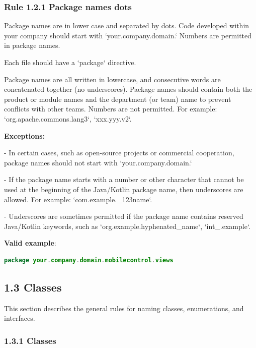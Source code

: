 \subsubsection*{\textbf{Rule 1.2.1 Package names dots}}
\leavevmode\newline

Package names are in lower case and separated by dots. Code developed within your company should start with `your.company.domain.` Numbers are permitted in package names.

Each file should have a `package` directive.

Package names are all written in lowercase, and consecutive words are concatenated together (no underscores). Package names should contain both the product or module names and the department (or team) name to prevent conflicts with other teams.  Numbers are not permitted. For example: `org.apache.commons.lang3`, `xxx.yyy.v2`.



\textbf{Exceptions:} 



- In certain cases, such as open-source projects or commercial cooperation, package names should not start with `your.company.domain.`

- If the package name starts with a number or other character that cannot be used at the beginning of the Java/Kotlin package name, then underscores are allowed. For example: `com.example._123name`.

- Underscores are sometimes permitted if the package name contains reserved Java/Kotlin keywords, such as `org.example.hyphenated_name`, `int_.example`.



\textbf{Valid example}: 

\begin{lstlisting}[language=Kotlin]
package your.company.domain.mobilecontrol.views
\end{lstlisting}


\subsection*{\textbf{1.3 Classes}}

This section describes the general rules for naming classes, enumerations, and interfaces.

\subsubsection*{\textbf{1.3.1 Classes}}
\leavevmode\newline

